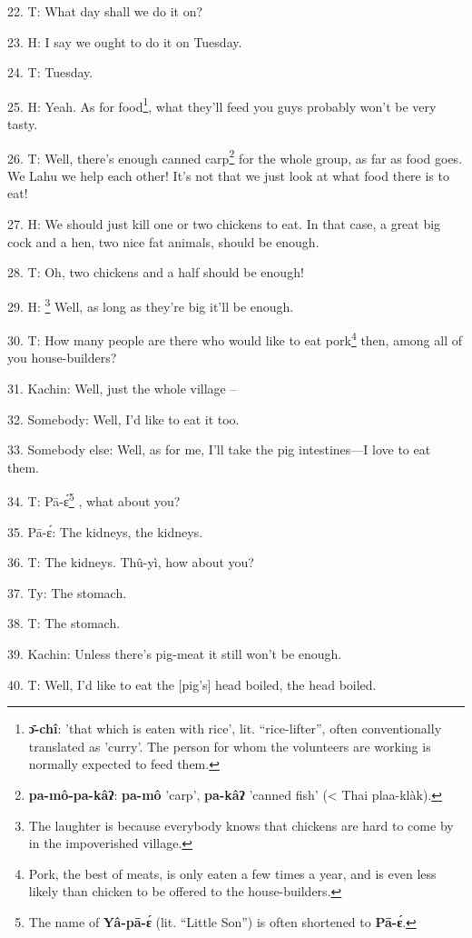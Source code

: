 22. T: What day shall we do it on?

23. H: I say we ought to do it on Tuesday.

24. T: Tuesday.

25. H: Yeah. As for food\footnote{\textbf{ɔ̄-chî}: 'that which is eaten with rice', lit. ``rice-lifter'', often conventionally translated as 'curry'. The person for whom the volunteers are working is normally expected to feed them.}, what they'll feed you guys probably won't be very
tasty.

26. T: Well, there's enough canned carp\footnote{\textbf{pa-mô-pa-kâʔ}: \textbf{pa-mô} 'carp', \textbf{pa-kâʔ} 'canned fish' (< Thai plaa-klàk).} for the whole group, as far as food
goes. We Lahu we help each other! It's not that we just look at what food there
is to eat!

27. H: We should just kill one or two chickens to eat. In that case, a great big
cock and a hen, two nice fat animals, should be enough.

28. T: Oh, two chickens and a half should be enough!

29. H: \footnote{The laughter is because everybody knows that chickens are hard to come by in the impoverished village.} Well, as long as they're big it'll be enough.

30. T: How many people are there who would like to eat pork\footnote{Pork, the best of meats, is only eaten a few times a year, and is even less likely than chicken to be offered to the house-builders.} then, among all
of you house-builders?

31. Kachin: Well, just the whole village --

32. Somebody: Well, I'd like to eat it too.

33. Somebody else: Well, as for me, I'll take the pig intestines---I love to eat
them.

34. T: Pā-ɛ́\footnote{The name of \textbf{Yâ-pā-ɛ́} (lit. ``Little Son'') is often shortened to \textbf{Pā-ɛ́}.} , what about you?

35. Pā-ɛ́: The kidneys, the kidneys.

36. T: The kidneys. Thû-yì, how about you?

37. Ty: The stomach.

38. T: The stomach.

39. Kachin: Unless there's pig-meat it still won't be enough.

40. T: Well, I'd like to eat the [pig's] head boiled, the head boiled.

